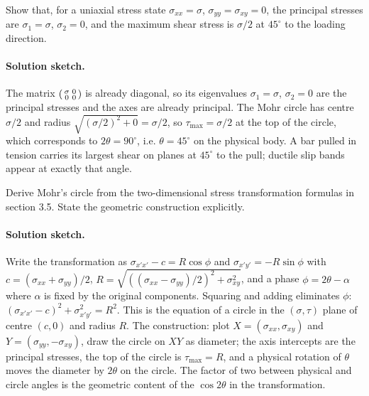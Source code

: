\begin{exercise}
Show that, for a uniaxial stress state $\sigma_{xx} = \sigma$,
$\sigma_{yy} = \sigma_{xy} = 0$, the principal stresses are
$\sigma_1 = \sigma$, $\sigma_2 = 0$, and the maximum shear stress is
$\sigma/2$ at $45^{\circ}$ to the loading direction.
\paragraph{Solution sketch.} The matrix $\begin{psmallmatrix}\sigma &
0\\ 0 & 0\end{psmallmatrix}$ is already diagonal, so its eigenvalues
$\sigma_1 = \sigma$, $\sigma_2 = 0$ are the principal stresses and the
axes are already principal. The Mohr circle has centre $\sigma/2$ and
radius $\sqrt{(\sigma/2)^2 + 0} = \sigma/2$, so $\tau_{\max} = \sigma/2$
at the top of the circle, which corresponds to $2\theta = 90^{\circ}$,
i.e. $\theta = 45^{\circ}$ on the physical body. A bar pulled in
tension carries its largest shear on planes at $45^{\circ}$ to the
pull; ductile slip bands appear at exactly that angle.
\end{exercise}

\begin{exercise}
Derive Mohr's circle from the two-dimensional stress transformation
formulas in section 3.5. State the geometric construction explicitly.
\paragraph{Solution sketch.} Write the transformation as
$\sigma_{x'x'} - c = R\cos\phi$ and $\sigma_{x'y'} = -R\sin\phi$ with
$c = (\sigma_{xx}+\sigma_{yy})/2$, $R = \sqrt{((\sigma_{xx}-\sigma_{yy})
/2)^2 + \sigma_{xy}^2}$, and a phase $\phi = 2\theta - \alpha$ where
$\alpha$ is fixed by the original components. Squaring and adding
eliminates $\phi$: $(\sigma_{x'x'} - c)^2 + \sigma_{x'y'}^2 = R^2$. This
is the equation of a circle in the $(\sigma, \tau)$ plane of centre
$(c, 0)$ and radius $R$. The construction: plot $X = (\sigma_{xx},
\sigma_{xy})$ and $Y = (\sigma_{yy}, -\sigma_{xy})$, draw the circle on
$XY$ as diameter; the axis intercepts are the principal stresses, the
top of the circle is $\tau_{\max} = R$, and a physical rotation of
$\theta$ moves the diameter by $2\theta$ on the circle. The factor of
two between physical and circle angles is the geometric content of the
$\cos 2\theta$ in the transformation.
\end{exercise}

